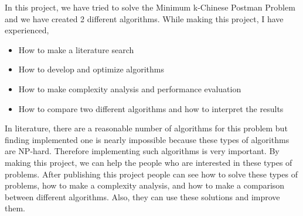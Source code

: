 \documentclass{beamer}
\begin{document}
\begin{chart4}
In this project, we have tried to solve the Minimum k-Chinese Postman Problem and we have created 2 different algorithms. 
\vspace{0.03\textheight}
\newline
While making this project, I have experienced,
\vspace{0.03\textheight}
\begin{itemize}
 \item How to make a literature search
 \vspace{0.02\textheight}
  \item How to develop and optimize algorithms
  \vspace{0.02\textheight}
 \item How to make complexity analysis and performance evaluation
 \vspace{0.02\textheight}
 \item How to compare two different algorithms and how to interpret the results
\end{itemize}

\end{chart4}

\begin{chart6}
In literature, there are a reasonable number of algorithms for this problem but finding implemented one is nearly impossible because these types of algorithms are NP-hard. Therefore implementing such algorithms is very important.
\newline
\newline
By making this project, we can help the people who are interested in these types of problems. After publishing this project people can see how to solve these types of problems, how to make a complexity analysis, and how to make a comparison between different algorithms. Also, they can use these solutions and improve them.

\end{chart6}
\end{document}
